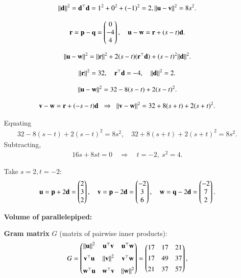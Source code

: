 \documentclass[journal]{IEEEtran}
\begin{document}
\begin{align}
{\left\lVert\mathbf{d}\right\rVert}^2=\mathbf{d}^\top\mathbf{d}=1^2+0^2+(-1)^2=2,
{\left\lVert\mathbf{u}-\mathbf{v}\right\rVert}^2=8s^2.
\end{align}

\begin{align}
\mathbf{r}=\mathbf{p}-\mathbf{q}=\begin{pmatrix}0\\-4\\4\end{pmatrix},\quad
\mathbf{u}-\mathbf{w}=\mathbf{r}+(s-t)\mathbf{d}.
\end{align}

\begin{align}
{\left\lVert\mathbf{u}-\mathbf{w}\right\rVert}^2={\left\lVert\mathbf{r}\right\rVert}^2+2(s-t)(\mathbf{r}^\top\mathbf{d})
+(s-t)^2{\left\lVert\mathbf{d}\right\rVert}^2.
\end{align}

\begin{align}
{\left\lVert\mathbf{r}\right\rVert}^2=32,\quad \mathbf{r}^\top\mathbf{d}=-4,\quad {\left\lVert\mathbf{d}\right\rVert}^2=2.
\end{align}

\begin{align}
{\left\lVert\mathbf{u}-\mathbf{w}\right\rVert}^2=32-8(s-t)+2(s-t)^2.
\end{align}

\begin{align}
\mathbf{v}-\mathbf{w}=\mathbf{r}+(-s-t)\mathbf{d} \;\;\Rightarrow\;\;
{\left\lVert\mathbf{v}-\mathbf{w}\right\rVert}^2=32+8(s+t)+2(s+t)^2.
\end{align}

Equating
\begin{align}
32-8(s-t)+2(s-t)^2=8s^2, \quad
32+8(s+t)+2(s+t)^2=8s^2.
\end{align}
Subtracting,
\begin{align}
16s+8st=0 \quad\Rightarrow\quad t=-2,\; s^2=4.
\end{align}

Take $ s=2,t=-2:$
\begin{align}
\mathbf{u}=\mathbf{p}+2\mathbf{d}=\begin{pmatrix}2\\3\\2\end{pmatrix},\quad
\mathbf{v}=\mathbf{p}-2\mathbf{d}=\begin{pmatrix}-2\\3\\6\end{pmatrix},\quad
\mathbf{w}=\mathbf{q}-2\mathbf{d}=\begin{pmatrix}-2\\7\\2\end{pmatrix}.
\end{align}

\textbf{Volume of parallelepiped:}

\textbf{Gram matrix }\(G\) (matrix of pairwise inner products):
\begin{align}
G=\begin{pmatrix}{\left\lVert\mathbf{u}\right\rVert}^2 & \mathbf{u}^\top\mathbf{v} & \mathbf{u}^\top\mathbf{w}\\[6pt]
\mathbf{v}^\top\mathbf{u} & {\left\lVert\mathbf{v}\right\rVert}^2 & \mathbf{v}^\top\mathbf{w}\\[6pt]
\mathbf{w}^\top\mathbf{u} & \mathbf{w}^\top\mathbf{v} & {\left\lVert\mathbf{w}\right\rVert}^2\end{pmatrix}
=
\begin{pmatrix}17 & 17 & 21\\[4pt]
17 & 49 & 37\\[4pt]
21 & 37 & 57\end{pmatrix},
\end{align}
\end{document}

